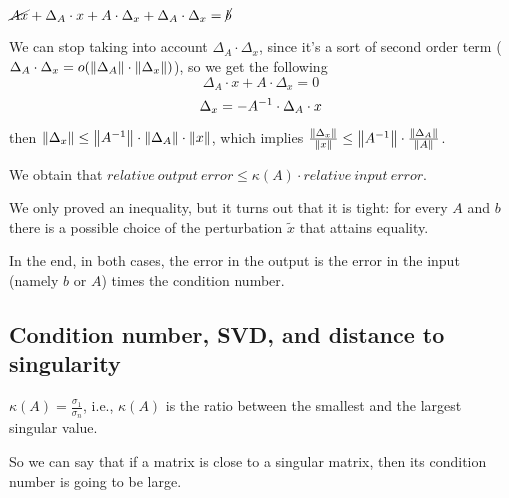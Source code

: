 \documentclass[computational_mathematics.tex]{subfiles}
\begin{document}
\begin{description}
    $\cancel{Ax} + \Delta_A \cdot x + A \cdot \Delta_x + \Delta_A \cdot \Delta_x = \cancel{b}$

We can stop taking into account $\Delta_A \cdot \Delta_x$, since it's a sort of second order term ($ \Delta_A \cdot \Delta_x = o (\left\lVert\Delta_A\right\rVert \cdot \left\lVert\Delta_x\right\rVert)$), so we get the following
  \[
      \Delta_A \cdot x + A \cdot \Delta_x = 0
  \]
  \[
      \Delta_x = -{A}^{-1} \cdot \Delta_A \cdot x
    \]

then $\left\lVert\Delta_x\right\rVert \le \left\lVert{A}^{-1}\right\rVert \cdot \left\lVert\Delta_A\right\rVert \cdot \left\lVert x\right\rVert$, which implies $\frac{\left\lVert\Delta_x\right\rVert}{\left\lVert x\right\rVert} \le \left\lVert{A}^{-1}\right\rVert \cdot \frac{\left\lVert\Delta_A\right\rVert}{\left\lVert A\right\rVert}$.

We obtain that $relative ~ output ~ error \le \kappa(A) \cdot relative ~ input ~ error$.
\end{description}
We only proved an inequality, but it turns out that it is tight: for every $A$ and $b$ there is a possible choice of the perturbation $\tilde{x}$ that attains equality.

In the end, in both cases, the error in the output is the error in the input (namely $b$ or $A$) times the condition number.

\subsection{Condition number, SVD, and distance to singularity}

\begin{proposition}
$\kappa(A) = \frac{\sigma_1}{\sigma_n}$, i.e., $\kappa(A)$ is the ratio between the smallest and the largest singular value.
\end{proposition}

So we can say that if a matrix is close to a singular matrix, then its condition number is going to be large.
\end{document}
